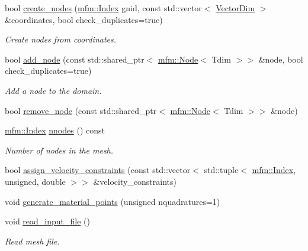 \begin{DoxyCompactItemize}
bool \hyperlink{classmfm_1_1_domain_a2098bfbd63556a6cd93fb852d704c1c4}{create\+\_\+nodes} (\hyperlink{namespacemfm_a7d021c8caa1852f673d78358edc6b7f9}{mfm\+::\+Index} gnid, const std\+::vector$<$ \hyperlink{classmfm_1_1_domain_a80581ccb1f293da341c2edbe528c26fc}{Vector\+Dim} $>$ \&coordinates, bool check\+\_\+duplicates=true)
\begin{DoxyCompactList}\small\item\em Create nodes from coordinates. \end{DoxyCompactList}\item 
bool \hyperlink{classmfm_1_1_domain_a0391235c4c353c37c550018e800d6c75}{add\+\_\+node} (const std\+::shared\+\_\+ptr$<$ \hyperlink{classmfm_1_1_node}{mfm\+::\+Node}$<$ Tdim $>$$>$ \&node, bool check\+\_\+duplicates=true)
\begin{DoxyCompactList}\small\item\em Add a node to the domain. \end{DoxyCompactList}\item 
bool \hyperlink{classmfm_1_1_domain_ab0d54b4f3be6ab4ea43af70d9beb3370}{remove\+\_\+node} (const std\+::shared\+\_\+ptr$<$ \hyperlink{classmfm_1_1_node}{mfm\+::\+Node}$<$ Tdim $>$$>$ \&node)
\item 
\mbox{\label{classmfm_1_1_domain_a895efdb39e864f421af7e34f1e44d1b1}} 
\hyperlink{namespacemfm_a7d021c8caa1852f673d78358edc6b7f9}{mfm\+::\+Index} \hyperlink{classmfm_1_1_domain_a895efdb39e864f421af7e34f1e44d1b1}{nnodes} () const
\begin{DoxyCompactList}\small\item\em Number of nodes in the mesh. \end{DoxyCompactList}\item 
bool \hyperlink{classmfm_1_1_domain_ae322699deacd071c5f4c789bf588cad7}{assign\+\_\+velocity\+\_\+constraints} (const std\+::vector$<$ std\+::tuple$<$ \hyperlink{namespacemfm_a7d021c8caa1852f673d78358edc6b7f9}{mfm\+::\+Index}, unsigned, double $>$$>$ \&velocity\+\_\+constraints)
\item 
void \hyperlink{classmfm_1_1_domain_af2edb71f67da7b927e9c2948ee5d3736}{generate\+\_\+material\+\_\+points} (unsigned nquadratures=1)
\item 
\mbox{\label{classmfm_1_1_domain_a2d0d731e83960bc649020b68c2be2994}} 
void \hyperlink{classmfm_1_1_domain_a2d0d731e83960bc649020b68c2be2994}{read\+\_\+input\+\_\+file} ()
\begin{DoxyCompactList}\small\item\em Read mesh file. \end{DoxyCompactList}\end{DoxyCompactItemize}


